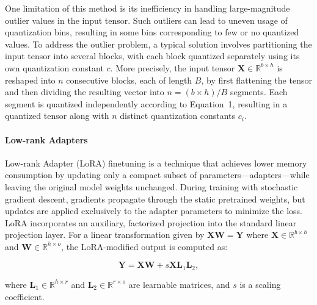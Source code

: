 One limitation of this method is its inefficiency in handling large-magnitude outlier values in the input tensor. Such outliers can lead to uneven usage of quantization bins, resulting in some bins corresponding to few or no quantized values. To address the outlier problem, a typical solution involves partitioning the input tensor into several blocks, with each block quantized separately using its own quantization constant $c$. More precisely, the input tensor $\mathbf{X}\in \mathbb{R}^{b\times h}$ is reshaped into $n$ consecutive blocks, each of length $B$, by first flattening the tensor and then dividing the resulting vector into ${n = ({b\times h} )/{B} }$ segments. Each segment is quantized independently according to Equation~1, resulting in a quantized tensor along with $n$ distinct quantization constants $c_i$.

\paragraph{Low-rank Adapters} Low-rank Adapter (LoRA) finetuning \citep{hu2021lora} is a technique that achieves lower memory consumption by updating only a compact subset of parameters—adapters—while leaving the original model weights unchanged. During training with stochastic gradient descent, gradients propagate through the static pretrained weights, but updates are applied exclusively to the adapter parameters to minimize the loss. LoRA incorporates an auxiliary, factorized projection into the standard linear projection layer. For a linear transformation given by ${\mathbf{X} \mathbf{W} = \mathbf{Y}}$ where $\mathbf{X}\in  \mathbb{R}^{b\times h}$ and $\mathbf{W}\in  \mathbb{R}^{h\times o}$, the LoRA-modified output is computed as:

\begin{equation}
    \mathbf{Y} = \mathbf{X}\mathbf{W} + s\mathbf{X}\mathbf{L}_1\mathbf{L}_2,
\end{equation}

where $\mathbf{L}_1\in  \mathbb{R}^{h\times r}$ and $\mathbf{L}_2\in  \mathbb{R}^{r\times o}$ are learnable matrices, and $s$ is a scaling coefficient.

